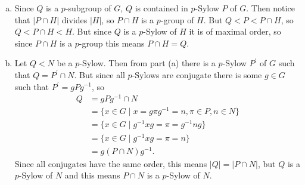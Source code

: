 \documentclass{article}
\begin{document}
\begin{Answer}
\begin{enumerate}[(a)]
  \item{
    Since $Q$ is a $p$-subgroup of $G$, $Q$ is contained in $p$-Sylow
    $P$ of $G$. Then notice that $|P \cap H|$ divides $|H|$, so
    $P \cap H$ is a $p$-group of $H$. But $Q < P < P \cap H$,
    so $Q < P \cap H < H$. But since $Q$ is a $p$-Sylow of $H$ it is
    of maximal order, so since $P \cap H$ is a $p$-group this means
    $P \cap H = Q$.
  }
  \item{
    Let $Q < N$ be a $p$-Sylow. Then from part (a) there is a
    $p$-Sylow $P^\prime$ of $G$ such that $Q = P^\prime \cap N$. But
    since all $p$-Sylows are conjugate there is some $g \in G$ such
    that $P^\prime = g P g^{-1}$, so
    \begin{align*}
      Q &= g P g^{-1} \cap N \\
        &= \{ x \in G \mid x = g \pi g^{-1} = n,
                           \pi \in P, n \in N \} \\
        &= \{ x \in G \mid g^{-1} x g = \pi = g^{-1} n g \} \\
        &= \{ x \in G \mid g^{-1} x g = \pi = n \} \\
        &= g (P \cap N) g^{-1}.
    \end{align*}
    Since all conjugates have the same order, this means
    $|Q| = |P \cap N|$, but $Q$ is a $p$-Sylow of $N$ and this means
    $P \cap N$ is a $p$-Sylow of $N$.
  }
\end{enumerate}
\end{Answer}
\end{document}

